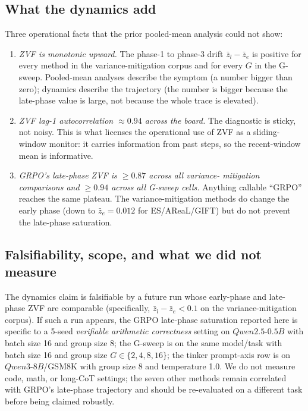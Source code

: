 \subsection{What the dynamics add}

Three operational facts that the prior pooled-mean analysis could
not show:

\begin{enumerate}
  \item \emph{ZVF is monotonic upward.} The phase-1 to phase-3 drift
        $\bar z_l - \bar z_e$ is positive for every method in the
        variance-mitigation corpus and for every $G$ in the G-sweep.
        Pooled-mean analyses describe the symptom (a number bigger
        than zero); dynamics describe the trajectory (the number is
        bigger because the late-phase value is large, not because the
        whole trace is elevated).
  \item \emph{ZVF lag-1 autocorrelation $\approx 0.94$ across the board.}
        The diagnostic is sticky, not noisy. This is what licenses
        the operational use of ZVF as a sliding-window monitor: it
        carries information from past steps, so the recent-window
        mean is informative.
  \item \emph{GRPO's late-phase ZVF is $\ge 0.87$ across all variance-
        mitigation comparisons and $\ge 0.94$ across all G-sweep cells.}
        Anything callable ``GRPO'' reaches the same plateau. The
        variance-mitigation methods do change the early phase
        (down to $\bar z_e = 0.012$ for ES/AReaL/GIFT) but do not
        prevent the late-phase saturation.
\end{enumerate}

\subsection{Falsifiability, scope, and what we did not measure}

The dynamics claim is falsifiable by a future run whose early-phase
and late-phase ZVF are comparable (specifically, $\bar z_l - \bar z_e
< 0.1$ on the variance-mitigation corpus). If such a run appears,
the GRPO late-phase saturation reported here is specific to a 5-seed
\emph{verifiable arithmetic correctness} setting on
$Qwen2.5\text{-}0.5B$ with batch size 16 and group size 8; the
G-sweep is on the same model/task with batch size 16 and group size
$G \in \{2,4,8,16\}$; the tinker prompt-axis row is on
$Qwen3\text{-}8B$/GSM8K with group size 8 and temperature 1.0. We do
not measure code, math, or long-CoT settings; the seven other
methods remain correlated with GRPO's late-phase trajectory and
should be re-evaluated on a different task before being claimed
robustly.

